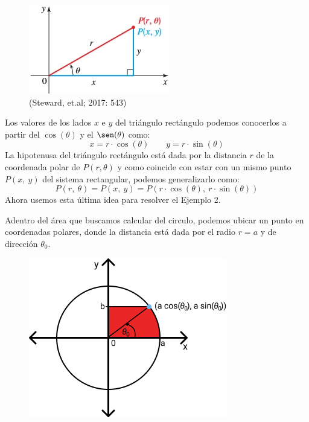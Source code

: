 \documentclass[12pt]{article}
\begin{document}
\begin{figure}[hbt!]
\centering
\includegraphics[scale=0.95]{img/polar-coord-2.jpg}
\caption{(Steward, et.al; 2017: 543)}
\end{figure}

Los valores de los lados $x$ e $y$ del triángulo rectángulo podemos conocerlos a partir del $\cos(\theta)$ y el $\sen(\theta)$ como:
\[
  x = r \cdot \cos(\theta) \qquad y = r \cdot \sin(\theta)
\]
La hipotenusa del triángulo rectángulo está dada por la distancia $r$ de la coordenada polar de $P(r, \theta)$ y como coincide con estar con un mismo punto $P(x, \ y)$ del sistema rectangular, podemos generalizarlo como:
\[
  P(r, \ \theta) = P(x, \ y) = P(r \cdot \cos(\theta), \ r \cdot \sin(\theta))
\]
Ahora usemos esta última idea para resolver el Ejemplo 2.

Adentro del área que buscamos calcular del circulo, podemos ubicar un punto en coordenadas polares, donde la distancia está dada por el radio $r = a$ y de dirección $\theta_{0}$.

\begin{figure}[hbt!]
\centering
\includegraphics[scale=0.7]{img/trig-int-example-2.jpg}
\end{figure}
\end{document}

